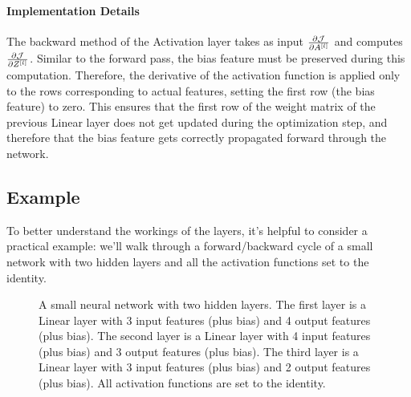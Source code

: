 \paragraph{Implementation Details} The backward method of the Activation layer takes as input $\pdv{\mathcal{J}}{A^{[l]}}$ and computes $\pdv{\mathcal{J}}{Z^{[l]}}$. Similar to the forward pass, the bias feature must be preserved during this computation. Therefore, the derivative of the activation function is applied only to the rows corresponding to actual features, setting the first row (the bias feature) to zero. This ensures that the first row of the weight matrix of the previous Linear layer does not get updated during the optimization step, and therefore that the bias feature gets correctly propagated forward through the network.

\subsection{Example}
To better understand the workings of the layers, it's helpful to consider a practical example: we'll walk through a forward/backward cycle of a small network with two hidden layers and all the activation functions set to the identity.

\begin{figure}[h]
    \centering
    \caption{A small neural network with two hidden layers. The first layer is a Linear layer with 3 input features (plus bias) and 4 output features (plus bias). The second layer is a Linear layer with 4 input features (plus bias) and 3 output features (plus bias). The third layer is a Linear layer with 3 input features (plus bias) and 2 output features (plus bias). All activation functions are set to the identity.}
    \label{fig:small-nn}
\end{figure}

